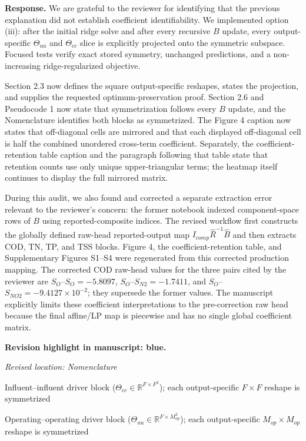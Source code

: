 \documentclass[11pt,a4paper]{article}
\newcommand{\revisionnotice}{\par\noindent\textcolor{revisionblue}{\textbf{Revision highlight in manuscript: blue.}}\par}
\newcommand{\excerptlocation}[1]{\par\noindent\textit{Revised location: #1}\par}
\begin{document}
\noindent\textbf{Response.} We are grateful to the reviewer for identifying that the previous explanation did not establish coefficient identifiability. We implemented option (iii): after the initial ridge solve and after every recursive $B$ update, every output-specific $\Theta_{uu}$ and $\Theta_{cc}$ slice is explicitly projected onto the symmetric subspace. Focused tests verify exact stored symmetry, unchanged predictions, and a non-increasing ridge-regularized objective.

Section 2.3 now defines the square output-specific reshapes, states the projection, and supplies the requested optimum-preservation proof. Section 2.6 and Pseudocode 1 now state that symmetrization follows every $B$ update, and the Nomenclature identifies both blocks as symmetrized. The Figure 4 caption now states that off-diagonal cells are mirrored and that each displayed off-diagonal cell is half the combined unordered cross-term coefficient. Separately, the coefficient-retention table caption and the paragraph following that table state that retention counts use only unique upper-triangular terms; the heatmap itself continues to display the full mirrored matrix.

During this audit, we also found and corrected a separate extraction error relevant to the reviewer's concern: the former notebook indexed component-space rows of $B$ using reported-composite indices. The revised workflow first constructs the globally defined raw-head reported-output map $I_{comp}\widehat{R}^{-1}\widehat{B}$ and then extracts COD, TN, TP, and TSS blocks. Figure 4, the coefficient-retention table, and Supplementary Figures S1--S4 were regenerated from this corrected production mapping. The corrected COD raw-head values for the three pairs cited by the reviewer are $S_O$--$S_O=-5.8097$, $S_O$--$S_{N2}=-1.7411$, and $S_O$--$S_{NO2}=-9.4127\times10^{-2}$; they supersede the former values. The manuscript explicitly limits these coefficient interpretations to the pre-correction raw head because the final affine/LP map is piecewise and has no single global coefficient matrix.

\revisionnotice

\excerptlocation{Nomenclature}
\begin{revisionexcerpt}
Influent--influent driver block ($\Theta_{cc} \in \mathbb{R}^{F \times F^2}$); each output-specific $F \times F$ reshape is symmetrized

Operating--operating driver block ($\Theta_{uu} \in \mathbb{R}^{F \times M_{op}^2}$); each output-specific $M_{op} \times M_{op}$ reshape is symmetrized
\end{revisionexcerpt}
\end{document}
